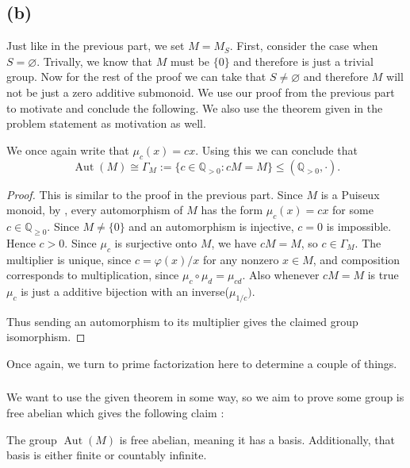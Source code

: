 \documentclass[11pt]{scrartcl}
\begin{document}
\subsection{(b)}

\begin{soln}
    Just like in the previous part, we set $M=M_S$.
	First, consider the case when $S=\varnothing$. Trivally, we know that 
	$M$ must be $\{0\}$ and therefore is just a trivial group. Now 
	for the rest of the proof we can take that $S\ne\varnothing$ and therefore
	$M$ will not be just a zero additive submonoid. We use our proof from 
	the previous part to motivate and conclude the following. We also 
	use the theorem given in the problem statement as motivation as well.

    \begin{claim*}
        We once again write that $\mu_c(x)=cx$. Using this we can 
		conclude that
        \[
        \operatorname{Aut}(M)\cong
        \Gamma_M:=
        \{c\in\mathbb Q_{>0}:cM=M\}
        \le (\mathbb Q_{>0},\cdot).
        \]
    \end{claim*}
    \begin{proof}
		This is similar to the proof in the previous part.
        Since $M$ is a Puiseux monoid, by \cite[Proposition~3.2(1)]{p6-gotti}, every automorphism
of $M$ has the form $\mu_c(x)=cx$ for some
$c\in\mathbb Q_{\ge0}$. Since $M\neq\{0\}$ and an
automorphism is injective, $c=0$ is impossible.
Hence $c>0$.
		Since $\mu_c$ is surjective onto $M$, we have $cM=M$, so $c\in\Gamma_M$.
The multiplier is unique, since $c=\varphi(x)/x$ for any nonzero
$x\in M$, and composition corresponds to multiplication, since
$\mu_c\circ\mu_d=\mu_{cd}$. Also whenever $cM=M$ is true
		$\mu_c$ is just a additive bijection with an inverse($\mu_{1/c})$. 

        Thus sending an automorphism to its multiplier gives the
        claimed group isomorphism.
    \end{proof}

    Once again, we turn to prime factorization here to determine a couple of
	things.

    \subsubsection*{}
	We want to use the given theorem in some way, so we aim to prove 
    some group is free abelian which gives the following claim : 
    \begin{claim*}
        The group $\operatorname{Aut}(M)$ is free abelian, meaning it has a 
		basis. Additionally, that basis is either finite or countably infinite.
    \end{claim*}


\end{soln}
\end{document}
